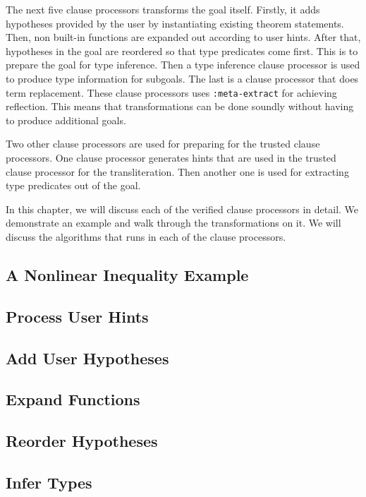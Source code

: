 The next five clause processors transforms the goal itself. Firstly, it adds
hypotheses provided by the user by instantiating existing theorem statements.
Then, non built-in functions are expanded out according to user hints.
After that, hypotheses in the goal are reordered so that type predicates come
first. 
This is to prepare the goal for type inference.
Then a type inference clause processor is used to produce type information for
subgoals.
The last is a clause processor that does term replacement.
These clause processors uses \texttt{:meta-extract} for achieving reflection.
This means that transformations can be done soundly without having to produce
additional goals.

Two other clause processors are used for preparing for the trusted clause
processors. One clause processor generates hints that are used in the trusted
clause processor for the transliteration. Then another one is used for
extracting type predicates out of the goal.

In this chapter, we will discuss each of the verified clause processors in
detail. We demonstrate an example and walk through the transformations on it.
We will discuss the algorithms that runs in each of the clause processors.

\subsection{A Nonlinear Inequality Example}


\subsection{Process User Hints}

\subsection{Add User Hypotheses}

\subsection{Expand Functions}

\subsection{Reorder Hypotheses}

\subsection{Infer Types}

